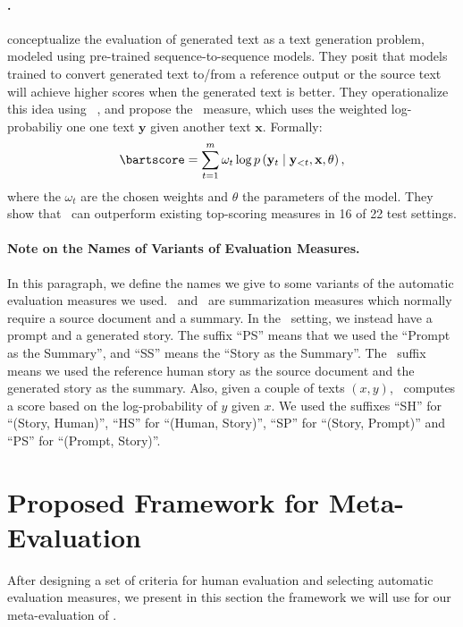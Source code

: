 \paragraph{\bartscore.}
\citet{yuan2021bartscore} conceptualize the evaluation of generated text as a text generation problem, modeled using pre-trained sequence-to-sequence models. They posit that models trained to convert generated text to/from a reference output or the source text will achieve higher scores when the generated text is better. They operationalize this idea using \bart\ \citep{lewis2019bart}, and propose the \bartscore\ measure, which uses the weighted log-probabiliy one one text $\mathbf{y}$ given another text $\mathbf{x}$. Formally:
\[ \bartscore = \sum_{t=1}^m \omega_t \log p \left( \mathbf{y}_t \mid \mathbf{y}_{<t}, \mathbf{x}, \theta \right) , \]
where the $\omega_t$ are the chosen weights and $\theta$ the parameters of the model. They show that \bartscore\ can outperform existing top-scoring measures in 16 of 22 test settings.

\paragraph{Note on the Names of Variants of Evaluation Measures.}
\label{par:measure_names}
In this paragraph, we define the names we give to some variants of the automatic evaluation measures we used. \supert\ and \blanc\ are summarization measures which normally require a source document and a summary. In the \asg\ setting, we instead have a prompt and a generated story. The suffix ``\textsc{PS}'' means that we used the ``Prompt as the Summary'', and ``\textsc{SS}'' means the ``Story as the Summary''. The \gold\ suffix means we used the reference human story as the source document and the generated story as the summary. Also, given a couple of texts $(x,y)$, \bartscore\ computes a score based on the log-probability of $y$ given $x$. We used the suffixes ``\textsc{SH}'' for ``(Story, Human)'', ``\textsc{HS}'' for ``(Human, Story)'', ``\textsc{SP}'' for ``(Story, Prompt)'' and ``\textsc{PS}'' for ``(Prompt, Story)''.

\section{Proposed Framework for Meta-Evaluation}
\label{sec:meta_evaluation_framework}

After designing a set of criteria for human evaluation and selecting automatic evaluation measures, we present in this section the framework we will use for our meta-evaluation of {\asg}.

